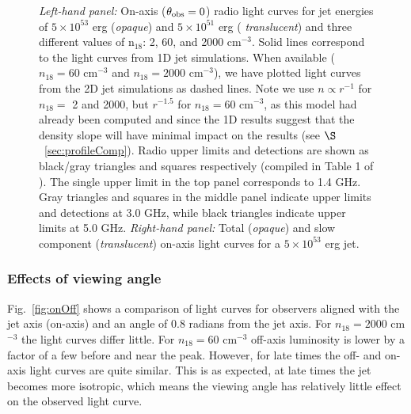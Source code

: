 \documentclass[usenatbib,fleqn]{mnras}
\begin{document}
\begin{figure}
  \caption{\label{fig:lightcurves} \textit{Left-hand panel:} On-axis
    ($\theta_{\rm obs}=0$) radio light curves for jet energies of
    $5\times 10^{53}$ erg ({\it opaque}) and $5\times 10^{51}$ erg ({\it
      translucent}) and three different values of n$_{18}$: 2, 60, and
    2000 cm$^{-3}$.  Solid lines correspond to the light curves from
    1D jet simulations. When available ($n_{18}=60$ cm$^{-3}$ and
    $n_{18}=2000$ cm$^{-3}$), we have plotted light curves from the 2D
    jet simulations as dashed lines. Note we use $n\propto r^{-1}$ for
    $n_{18}=$ 2 and 2000, but $r^{-1.5}$ for $n_{18}=60$ cm$^{-3}$, as
    this model had already been computed and since the 1D results
    suggest that the density slope will have minimal impact on the
    results (see $\S$~\ref{sec:profileComp}).  Radio upper limits and
    detections are shown as black/gray triangles and squares
    respectively (compiled in Table 1 of \citealt{Mimica+2015}). The
    single upper limit in the top panel corresponds to 1.4 GHz. Gray
    triangles and squares in the middle panel indicate upper limits
    and detections at 3.0 GHz, while black triangles indicate upper
    limits at 5.0 GHz. \textit{Right-hand panel:} Total ({\it opaque})
    and slow component ({\it translucent}) on-axis light curves for a
    $5\times 10^{53}$ erg jet.}
\end{figure}


 \subsubsection{Effects of viewing angle}
 Fig.~\ref{fig:onOff} shows a comparison of light curves for observers
 aligned with the jet axis (on-axis) and an angle of 0.8 radians from
 the jet axis.  For $n_{18}=2000$ cm$^{-3}$ the light curves differ
 little.  For $n_{18}=60$ cm$^{-3}$ off-axis luminosity is lower by a
 factor of a few before and near the peak. However, for late times the
 off- and on-axis light curves are quite similar. This is as expected,
 at late times the jet becomes more isotropic, which means the viewing
 angle has relatively little effect on the observed light curve.
\end{document}
